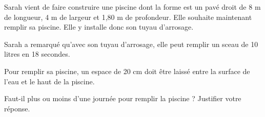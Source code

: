 
\medskip

Sarah vient de faire construire une piscine dont la forme est un pavé droit de 8 m de longueur, 4 m de largeur et 1,80 m de profondeur. Elle souhaite maintenant remplir sa piscine. Elle y installe donc son tuyau d'arrosage. 

Sarah a remarqué qu'avec son tuyau d'arrosage, elle peut remplir un sceau de 10 litres en 18 secondes. 

Pour remplir sa piscine, un espace de 20 cm doit être laissé entre la surface de l'eau et le haut de la piscine. 

Faut-il plus ou moins d'une journée pour remplir la piscine ? Justifier votre réponse. \\

\vspace{0,5cm}

